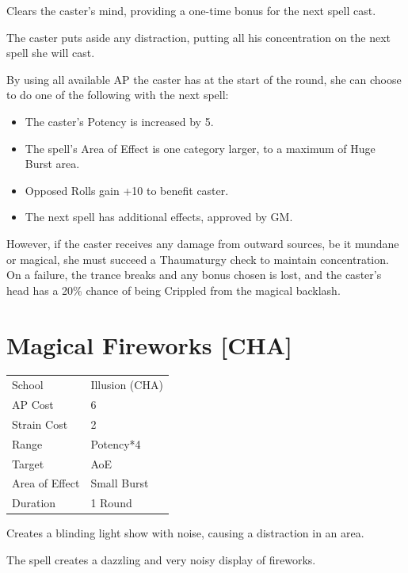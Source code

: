 \documentclass[11pt,a4paper,twocolumn]{book}
\begin{document}
\medskip

Clears the caster's mind, providing a one-time bonus for the next spell cast.

The caster puts aside any distraction, putting all his concentration on the next spell she will cast.

By using all available AP the caster has at the start of the round, she can choose to do one of the following with the next spell:
\begin{itemize}
  \item The caster's Potency is increased by 5.
  \item The spell's Area of Effect is one category larger, to a maximum of Huge Burst area.
  \item Opposed Rolls gain +10 to benefit caster.
  \item The next spell has additional effects, approved by GM.
\end{itemize}

However, if the caster receives any damage from outward sources, be it mundane or magical, she must succeed a Thaumaturgy check to maintain concentration. On a failure, the trance breaks and any bonus chosen is lost, and the caster's head has a 20\% chance of being Crippled from the magical backlash.


\section*{Magical Fireworks [CHA]}
{
	\begin{tabu} to 75mm{| X[l,4] | X[l,7] |}
		\hline
		School 			& Illusion (CHA) 		\\
        AP Cost	      	& 6 					\\
        Strain Cost     & 2 					\\
        Range     		& Potency*4				\\
        Target      	& AoE					\\
        Area of Effect  & Small Burst  	 		\\
        Duration     	& 1 Round				\\ \hline
	\end{tabu}
		
}

\medskip

Creates a blinding light show with noise, causing a distraction in an area.

The spell creates a dazzling and very noisy display of fireworks.
\end{document}

